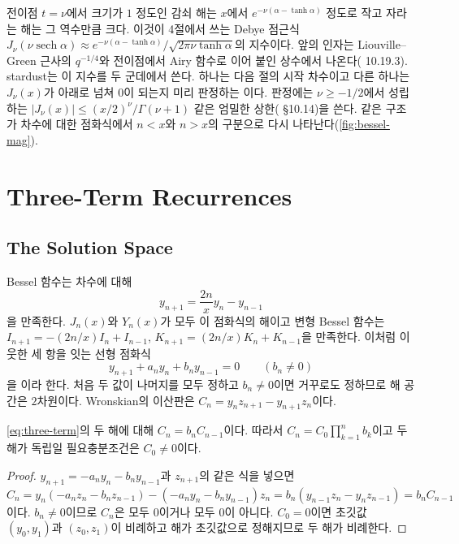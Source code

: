 전이점 $t=\nu$에서 크기가 $1$ 정도인 감쇠 해는 $x$에서 $e^{-\nu(\alpha-\tanh\alpha)}$ 정도로 작고 자라는 해는 그 역수만큼 크다. 이것이 4절에서 쓰는 Debye 점근식 $J_\nu(\nu\operatorname{sech}\alpha)\approx e^{-\nu(\alpha-\tanh\alpha)}/\sqrt{2\pi\nu\tanh\alpha}$의 지수이다. 앞의 인자는 Liouville--Green 근사의 $q^{-1/4}$와 전이점에서 Airy 함수로 이어 붙인 상수에서 나온다(\cite{dlmf} 10.19.3). stardust는 이 지수를 두 군데에서 쓴다. 하나는 다음 절의 시작 차수이고 다른 하나는 $J_\nu(x)$가 아래로 넘쳐 $0$이 되는지 미리 판정하는 이다. 판정에는 $\nu\ge-1/2$에서 성립하는 $|J_\nu(x)|\le(x/2)^\nu/\Gamma(\nu+1)$ 같은 엄밀한 상한(\cite{dlmf} §10.14)을 쓴다. 같은 구조가 차수에 대한 점화식에서 $n<x$와 $n>x$의 구분으로 다시 나타난다(\cref{fig:bessel-mag}).


\section{Three-Term Recurrences}
\label{sec:three-term}

\subsection{The Solution Space}

Bessel 함수는 차수에 대해
\begin{equation}
\label{eq:bessel-rec}
y_{n+1}=\frac{2n}{x}y_n-y_{n-1}
\end{equation}
을 만족한다. $J_n(x)$와 $Y_n(x)$가 모두 이 점화식의 해이고 변형 Bessel 함수는 $I_{n+1}=-(2n/x)I_n+I_{n-1}$, $K_{n+1}=(2n/x)K_n+K_{n-1}$을 만족한다. 이처럼 이웃한 세 항을 잇는 선형 점화식
\begin{equation}
\label{eq:three-term}
y_{n+1}+a_ny_n+b_ny_{n-1}=0\qquad(b_n\ne0)
\end{equation}
을 이라 한다. 처음 두 값이 나머지를 모두 정하고 $b_n\ne0$이면 거꾸로도 정하므로 해 공간은 $2$차원이다. Wronskian의 이산판은  $C_n=y_nz_{n+1}-y_{n+1}z_n$이다.

\begin{proposition}
\label{prop:casorati}
\cref{eq:three-term}의 두 해에 대해 $C_n=b_nC_{n-1}$이다. 따라서 $C_n=C_0\prod_{k=1}^nb_k$이고 두 해가 독립일 필요충분조건은 $C_0\ne0$이다.
\end{proposition}

\begin{proof}
$y_{n+1}=-a_ny_n-b_ny_{n-1}$과 $z_{n+1}$의 같은 식을 넣으면 $C_n=y_n(-a_nz_n-b_nz_{n-1})-(-a_ny_n-b_ny_{n-1})z_n=b_n(y_{n-1}z_n-y_nz_{n-1})=b_nC_{n-1}$이다. $b_n\ne0$이므로 $C_n$은 모두 $0$이거나 모두 $0$이 아니다. $C_0=0$이면 초깃값 $(y_0,y_1)$과 $(z_0,z_1)$이 비례하고 해가 초깃값으로 정해지므로 두 해가 비례한다.
\end{proof}

